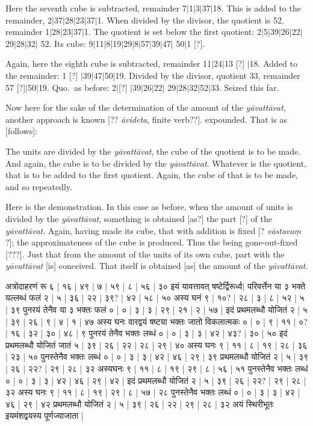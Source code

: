\documentclass[12pt]{book}
\let\*=\d
\def\ya{\textit{y\=avat\-t\=avat}}
\def\danda{$|$}
\begin{document}
\newpage


Here the seventh cube is subtracted, remainder 7\danda 1\danda 3\danda 37\danda 18. 
This is added to the remainder, 2\danda 37\danda 28\danda 23\danda 37\danda 1.
When divided by the divisor, the quotient is 52, remainder 
1\danda 28\danda 23\danda 37\danda 1. The quotient 
is set below the first quotient: 2\danda 5\danda 39\danda 26\danda 22\danda 29\danda 28\danda 32\danda
52. Its cube: 9\danda 11\danda 8\danda 19\danda 29\danda 8\danda 57\danda 39\danda 47\danda
50\danda 1 [?]. 

Again, here the eighth cube is subtracted, remainder 11\danda 24\danda 13 [?] \danda 18. Added to the
remainder: 1 [?] \danda 39\danda 47\danda 50\danda 19. Divided by the divisor, quotient 33, 
remainder 57 [?]\danda 50\danda 19. Quo.\ as before: 2\danda [?] \danda 39\danda 26\danda 22\danda
29\danda 28\danda 32\danda 52\danda 33. Seized this far. 

Now here for the sake of the determination of the amount of the \ya, another approach is known 
[?? \textit{\=avideta}, finite verb??]. 
expounded. That is as [follows]: 

The units are divided by the \ya, the cube of the quotient is to be made. And again, the cube is
to be divided by the \ya. Whatever is the quotient, that is to be added to the first quotient. Again,
the cube of that is to be made, and so repeatedly.  

Here is the demonstration. In this case as before, when the amount of units is divided by the \ya, 
something is obtained [as?] the part [?] of the \ya. Again, having made its cube, that with addition
is fixed [? \textit{v\=astava\*m} ?]; the approximateness of the cube is produced. Thus the being
gone-out-fixed [???].  Just that from the amount of the units of its own cube, part with the \ya 
[is] conceived. That itself is obtained [as] the amount of the \ya. 

\newpage

{\s अत्रोदाहरणं रू ६ | १६ | ४९ | ७ | ५९ | ८ | ५६ | ३० इयं यावत्तावत् षष्टेर्द्विरूर्ध्व$|$
परिवर्त्तेन या ३ भक्ते यल्लब्धं फलं २ | ५ | ३६ | २२ | ३९? | ४२ | ५८ | ५० अस्य घनं ९ | १०? | २८ | ३ | ८ | ५२ | ५ | ३९
पुनरयं तेनैव या ३ भक्तः फलं ० | ० | ३ | ३ | २९ | २१ | २ | ५७ |
इदं प्रथमलब्धौ योजितं २ | ५ | ३९ | २६ | ९ | ४ | १ | ४७ अस्य घनः वारद्वयं षष्ट्या भक्तः जातो विकलात्मकः ० | ० | ९ | ११ | ०? | १६ | ३२ | ३० | ४८ | ९ पुनरयं तेनैव भक्तः लब्धं ० | ० | ३ | ३ | ४२ | ४३? | ३० | ५०
इदं प्रथमलब्धौ योजितं जातं ५ | ३९ | २६ | २२ | २८ | २९ | ४० अस्य घनः ९ | ११ | ८ | १९ | २८ | ३६ | २३ | ५० पुनस्तेनैव भक्तः लब्धं ० | ० | ३ | ३ | ४२ | ४६ | २९ | ३९ प्रथमलब्धौ योजितं २ | ५ | ३९ | २६ | २२? | २९ | २८ | ३२
अस्यघनः ९ | ११ | ८ | १९ | २९ | ८ | ५६ | ५१ पुनस्तेनैव भक्तः लब्धं ० | ० | ३ | ३ | ४२ | ४६ | २९ | ४२ | इदं प्रथमलब्धौ योजितं २ | ५ | ३९ | २६ | २२? | २९ | २८ | ३२ अस्य घनः ९ | ११ | ८ | १९ | २९ | ८ | ५७ | २८
पुनस्तेनैव भक्तः लब्धं ० | ० | ३ | ३ | ४२ | ४६ | २९ | ४२ प्रथमलब्धौ योजितं २ | ५ | ३९ | २६ | २२ | २९ | २८ | ३२ अयं स्थिरीभूतः इयमंशद्वयस्य पूर्णज्याजाता |} 
\end{document}
